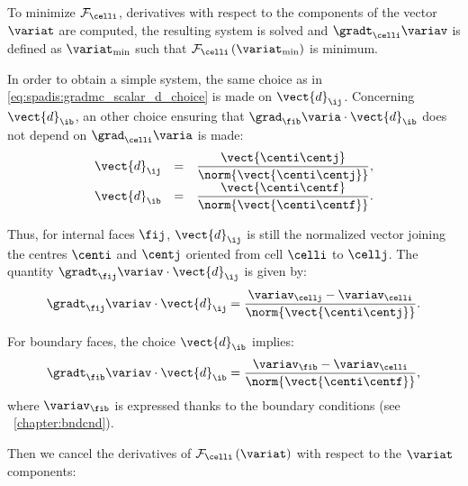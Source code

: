 To minimize $\mathcal{F}_\celli$, derivatives with respect to the components of the 
vector $\variat  $ are computed, the resulting system is solved and $\gradt_\celli \variav$ is defined 
as $\variat_{\min}$ such that $\mathcal{F}_\celli \left( \variat_{\min}\right)$ is minimum.

In order to obtain a simple system, the same choice as in \eqref{eq:spadis:gradmc_scalar_d_choice} is made on $\vect{d}_\ij$.
Concerning $\vect{d}_\ib$, an other choice ensuring that $\grad_{\fib} \varia   \cdot \vect{d}_\ib $ does not
depend on $\grad_{\celli} \varia $ is made:
%
\begin{equation}\label{eq:spadis:gradmv_scalar_d_choice}
\begin{array}{r c l}
\vect{d}_\ij &=& \dfrac{\vect{\centi \centj}}{\norm{\vect{\centi \centj}}}, \\
\vect{d}_\ib &=& \dfrac{\vect{\centi \centf}}{\norm{\vect{\centi \centf}}} .
\end{array}
\end{equation}

Thus, for internal faces $\fij$, $\vect{d}_\ij$ is still the normalized vector joining 
the centres $\centi$ and $\centj$ oriented from cell $\celli$ to $\cellj$.
The quantity  $\gradt_{\fij} \variav   \cdot \vect{d}_\ij$ is given by:
\begin{equation}
\gradt_{\fij} \variav   \cdot \vect{d}_\ij =\dfrac{\variav_\cellj - \variav_\celli }{\norm{\vect{\centi \centj}}}.
\end{equation}

For boundary faces, the choice $\vect{d}_\ib$ implies:
\begin{equation}
\gradt_{\fib} \variav   \cdot \vect{d}_\ib =\dfrac{\variav_\fib - \variav_\celli }{\norm{\vect{\centi \centf}}},
\end{equation}
where $\variav_\fib$ is expressed thanks to the boundary conditions (see \chaptername~\ref{chapter:bndcnd}).

Then we cancel the derivatives of 
$\mathcal{F}_\celli \left( \variat \right)$ with respect to the $ \variat$ components:


